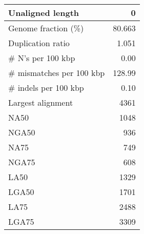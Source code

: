 \documentclass[12pt,a4paper]{article}
\begin{document}
\begin{table}[ht]
\begin{center}
\begin{tabular}{|l*{1}{|r}|}
Unaligned length & 0 \\ \hline
Genome fraction (\%) & 80.663 \\ \hline
Duplication ratio & 1.051 \\ \hline
\# N's per 100 kbp & 0.00 \\ \hline
\# mismatches per 100 kbp & 128.99 \\ \hline
\# indels per 100 kbp & 0.10 \\ \hline
Largest alignment & 4361 \\ \hline
NA50 & 1048 \\ \hline
NGA50 & 936 \\ \hline
NA75 & 749 \\ \hline
NGA75 & 608 \\ \hline
LA50 & 1329 \\ \hline
LGA50 & 1701 \\ \hline
LA75 & 2488 \\ \hline
LGA75 & 3309 \\ \hline
\end{tabular}
\end{center}
\end{table}
\end{document}
